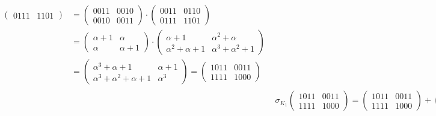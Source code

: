 \documentclass[fleqn]{article}
\begin{document}
\begin{equation*}
\begin{aligned}
\begin{aligned}
\begin{pmatrix}
                    0111 & 1101
                \end{pmatrix} &=
                \begin{pmatrix}
                    0011 & 0010 \\
                    0010 & 0011
                \end{pmatrix} \cdot
                \begin{pmatrix}
                    0011 & 0110 \\
                    0111 & 1101
                \end{pmatrix} \\ &= 
                 \begin{pmatrix}
                    \alpha + 1 & \alpha \\
                    \alpha & \alpha + 1
                 \end{pmatrix} \cdot
                    \begin{pmatrix} 
                        \alpha + 1 & \alpha^2 + \alpha \\
                        \alpha^2 + \alpha + 1 & \alpha^3 + \alpha^2 + 1
                    \end{pmatrix} \\ &=
                    \begin{pmatrix}
                        \alpha^3 + \alpha + 1 & \alpha + 1 \\
                        \alpha^3 + \alpha^2 + \alpha + 1 & \alpha^3
                    \end{pmatrix} = 
                    \begin{pmatrix}
                        1011 & 0011 \\
                        1111 & 1000
                    \end{pmatrix}
            \end{aligned} \\
            &\sigma_{K_1} \begin{pmatrix}
                1011 & 0011 \\
                1111 & 1000
            \end{pmatrix} =
            \begin{pmatrix}
                1011 & 0011 \\
                1111 & 1000
            \end{pmatrix} +
            \begin{pmatrix}
                0011 & 1110 \\

\end{pmatrix}
\end{aligned}
\end{equation*}
\end{document}
